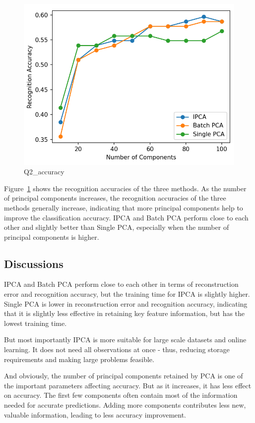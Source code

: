 \begin{figure}[H]
	\centering
	\includegraphics[width=0.8\linewidth]{Ressources/Q2_accuracy.png}
	
	\caption{Q2\_accuracy}
	\label{fig:Q2_accuracy}
\end{figure}
Figure~\ref{fig:Q2_accuracy} shows the recognition accuracies of the three methods. As the number of principal components increases, the recognition accuracies of the three methods generally increase, indicating that more principal components help to improve the classification accuracy. IPCA and Batch PCA perform close to each other and slightly better than Single PCA, especially when the number of principal components is higher.


\subsection{Discussions}

IPCA and Batch PCA perform close to each other in terms of reconstruction error and recognition accuracy, but the training time for IPCA is slightly higher. Single PCA is lower in reconstruction error and recognition accuracy, indicating that it is slightly less effective in retaining key feature information, but has the lowest training time.

But most importantly IPCA is more suitable for large scale datasets and online learning. It does not need all observations at once - thus, reducing storage requirements and making large problems feasible.

And obviously, the number of principal components retained by PCA is one of the important parameters affecting accuracy. But as it increases, it has less effect on accuracy. The first few components often contain most of the information needed for accurate predictions. Adding more components contributes less new, valuable information, leading to less accuracy improvement.
\newline